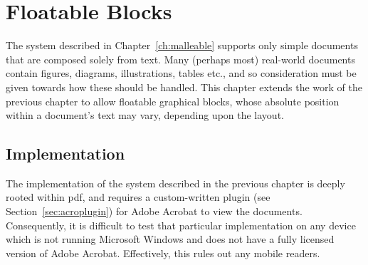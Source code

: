 \cleardoublepage
\chapter{Floatable Blocks}\label{ch:floats}

% 

The system described in Chapter~\ref{ch:malleable} supports only simple documents that are composed solely from text. Many (perhaps most) real-world documents contain figures, diagrams, illustrations, tables etc., and so consideration must be given towards how these should be handled.
This chapter extends the work of the previous chapter to allow floatable graphical blocks, whose absolute position within a document's text may vary, depending upon the layout.

\section{Implementation}

The implementation of the system described in the previous chapter is deeply rooted within \gls{pdf}, and requires a custom-written plugin (see Section~\ref{sec:acroplugin}) for Adobe Acrobat to view the documents. Consequently, it is difficult to test that particular implementation on any device which is not running Microsoft Windows and does not have a fully licensed version of Adobe Acrobat. Effectively, this rules out any mobile \ebook{} readers.

